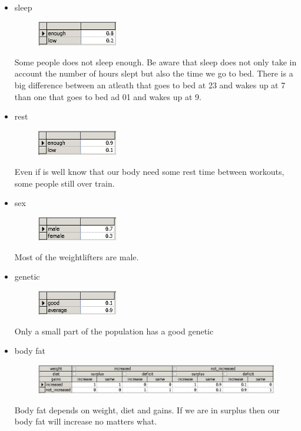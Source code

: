 \documentclass[11pt]{article}
\begin{document}
\begin{itemize}
\item sleep
\begin{figure}[H]
\includegraphics[width=0.33\textwidth]{./images/nodes/definitions/4.png}
\end{figure}

Some people does not sleep enough. Be aware that sleep does not only take in account the number of hours slept but also the time we go to bed. There is a big difference between an atleath that goes to bed at 23 and wakes up at 7 than one that goes to bed ad 01 and wakes up at 9.

\item rest
\begin{figure}[H]
\includegraphics[width=0.33\textwidth]{./images/nodes/definitions/5.png}
\end{figure}

Even if is well know that our body need some rest time between workouts, some people still over train.

\item sex
\begin{figure}[H]
\includegraphics[width=0.33\textwidth]{./images/nodes/definitions/6.png}
\end{figure}
Most of the weightlifters are male.

\item genetic
\begin{figure}[H]
\includegraphics[width=0.33\textwidth]{./images/nodes/definitions/7.png}
\end{figure}
Only a small part of the population has a good genetic

\item body fat
\begin{figure}[H]
\includegraphics[width=\textwidth]{./images/nodes/definitions/8.png}
\end{figure}
Body fat depends on weight, diet and gains. If we are in surplus then our body fat will increase no matters what.


\end{itemize}
\end{document}
